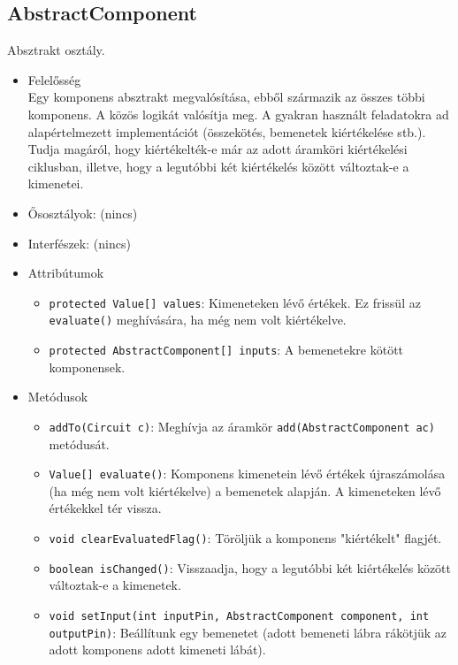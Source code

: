 \subsection{AbstractComponent}
Absztrakt osztály.
\begin{itemize}
\item Felelősség\\
Egy komponens absztrakt megvalósítása, ebből származik az összes többi  komponens. A közös logikát valósítja meg. A gyakran használt feladatokra ad alapértelmezett implementációt (összekötés, bemenetek kiértékelése stb.). Tudja magáról, hogy kiértékelték-e már az adott áramköri kiértékelési ciklusban, illetve, hogy a legutóbbi két kiértékelés között változtak-e a kimenetei.
\item Ősosztályok: (nincs)
\item Interfészek: (nincs)
\item Attribútumok $\ $
\begin{itemize}
	\item \texttt{protected Value[] values}: Kimeneteken lévő értékek. Ez frissül az \texttt{evaluate()} meghívására, ha még nem volt kiértékelve.
	\item \texttt{protected AbstractComponent[] inputs}: A bemenetekre kötött komponensek.
\end{itemize}
\item Metódusok$\ $
\begin{itemize}
	\item \texttt{addTo(Circuit c)}: Meghívja az áramkör \texttt{add(AbstractComponent ac)} metódusát.
	\item \texttt{Value[] evaluate()}: Komponens kimenetein lévő értékek újraszámolása (ha még nem volt kiértékelve) a bemenetek alapján. A kimeneteken lévő értékekkel tér vissza.
	\item \texttt{void clearEvaluatedFlag()}: Töröljük a komponens "kiértékelt" flagjét.
	\item \texttt{boolean isChanged()}: Visszaadja, hogy a legutóbbi két kiértékelés között változtak-e a kimenetek.
	\item \raggedright \texttt{void setInput(int inputPin, AbstractComponent component, int outputPin)}: Beállítunk egy bemenetet (adott bemeneti lábra rákötjük az adott komponens adott kimeneti lábát).
\end{itemize}
\end{itemize}

